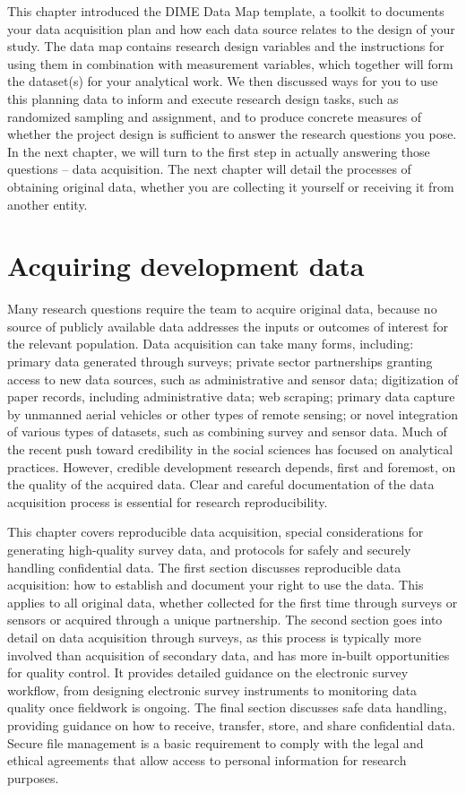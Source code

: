 \documentclass[
]{book}
\begin{document}
This chapter introduced the DIME Data Map template,
a toolkit to documents your data acquisition plan and
how each data source relates to the design of your study.
The data map contains research design variables and the instructions
for using them in combination with measurement variables, which together
will form the dataset(s) for your analytical work.
We then discussed ways for you to use this planning data
to inform and execute research design tasks,
such as randomized sampling and assignment,
and to produce concrete measures
of whether the project design is sufficient to answer the research questions you pose.
In the next chapter,
we will turn to the first step in actually answering those questions --
data acquisition.
The next chapter will detail the processes of obtaining
original data,
whether you are collecting it yourself or
receiving it from another entity.

\hypertarget{acquisition}{%
\chapter{Acquiring development data}\label{acquisition}}

Many research questions require the team to acquire original data,
because no source of publicly available data addresses the
inputs or outcomes of interest for the relevant population.
Data acquisition can take many forms, including:
primary data generated through surveys;
private sector partnerships granting access to new data sources, such as administrative and sensor data;
digitization of paper records, including administrative data; web scraping;
primary data capture by unmanned aerial vehicles or other types of remote sensing;
or novel integration of various types of datasets, such as combining survey and sensor data.
Much of the recent push toward credibility in the social sciences has focused on analytical practices.
However, credible development research depends, first and foremost, on the quality of the acquired data.
Clear and careful documentation of the data acquisition process is essential for research reproducibility.

This chapter covers reproducible data acquisition,
special considerations for generating high-quality survey data,
and protocols for safely and securely handling confidential data.
The first section discusses reproducible data acquisition:
how to establish and document your right to use the data.
This applies to all original data,
whether collected for the first time through surveys or sensors or acquired through a unique partnership.
The second section goes into detail on data acquisition through surveys,
as this process is typically more involved than acquisition of secondary data,
and has more in-built opportunities for quality control.
It provides detailed guidance on the electronic survey workflow,
from designing electronic survey instruments to monitoring data quality once fieldwork is ongoing.
The final section discusses safe data handling,
providing guidance on how to receive, transfer, store, and share confidential data.
Secure file management is a basic requirement to comply with the legal and
ethical agreements that allow access to personal information for research purposes.
\end{document}
